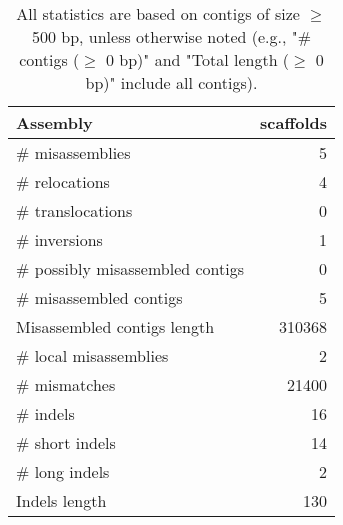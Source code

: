 \documentclass[12pt,a4paper]{article}
\begin{document}
\begin{table}[ht]
\begin{center}
\caption{All statistics are based on contigs of size $\geq$ 500 bp, unless otherwise noted (e.g., "\# contigs ($\geq$ 0 bp)" and "Total length ($\geq$ 0 bp)" include all contigs).}
\begin{tabular}{|l*{1}{|r}|}
\hline
Assembly & scaffolds \\ \hline
\# misassemblies & 5 \\ \hline
\hspace{5mm}\# relocations & 4 \\ \hline
\hspace{5mm}\# translocations & 0 \\ \hline
\hspace{5mm}\# inversions & 1 \\ \hline
\# possibly misassembled contigs & 0 \\ \hline
\# misassembled contigs & 5 \\ \hline
Misassembled contigs length & 310368 \\ \hline
\# local misassemblies & 2 \\ \hline
\# mismatches & 21400 \\ \hline
\# indels & 16 \\ \hline
\hspace{5mm}\# short indels & 14 \\ \hline
\hspace{5mm}\# long indels & 2 \\ \hline
Indels length & 130 \\ \hline
\end{tabular}
\end{center}
\end{table}
\end{document}
